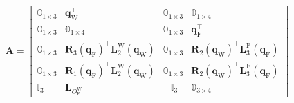 \begin{align}
\label{eq:A_contraint}
\boldsymbol{A} = \begin{bmatrix}
            \mathbb{0}_{1 \times 3} & \boldsymbol{q}_{\text{W}}^\top & \mathbb{0}_{1 \times 3} & \mathbb{0}_{1 \times 4}\\
            \mathbb{0}_{1 \times 3} & \mathbb{0}_{1 \times 4} & \mathbb{0}_{1 \times 3} & \boldsymbol{q}_{\text{F}}^\top\\
            \mathbb{0}_{1 \times 3} & \boldsymbol{R}_{3}(\boldsymbol{q}_{\text{F}})^\top \boldsymbol{L}_{2}^{\text{W}}( \boldsymbol{q}_{\text{W}} ) & \mathbb{0}_{1 \times 3} & \boldsymbol{R}_{2}(\boldsymbol{q}_{\text{W}})^\top \boldsymbol{L}_{3}^{\text{F}}( \boldsymbol{q}_{\text{F}} ) \\
            \mathbb{0}_{1 \times 3} & \boldsymbol{R}_{1}(\boldsymbol{q}_{\text{F}})^\top \boldsymbol{L}_{2}^{\text{W}}( \boldsymbol{q}_{\text{W}} ) & \mathbb{0}_{1 \times 3} & \boldsymbol{R}_{2}(\boldsymbol{q}_{\text{W}})^\top \boldsymbol{L}_{3}^{\text{F}}( \boldsymbol{q}_{\text{F}} ) \\
            \mathbb{I}_{3} & \boldsymbol{L}_{O_{\text{F}}^{\text{W}}} & -\mathbb{I}_{3} & \mathbb{0}_{3 \times 4}
        \end{bmatrix}
\end{align}

